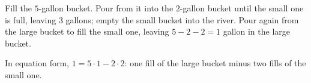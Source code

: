 Fill the $5$-gallon bucket. Pour from it into the $2$-gallon bucket until the small one is full, leaving $3$ gallons; empty the small bucket into the river. Pour again from the large bucket to fill the small one, leaving $5-2-2=\boxed{1}$ gallon in the large bucket.

In equation form, $1=5\cdot1-2\cdot2$: one fill of the large bucket minus two fills of the small one.
